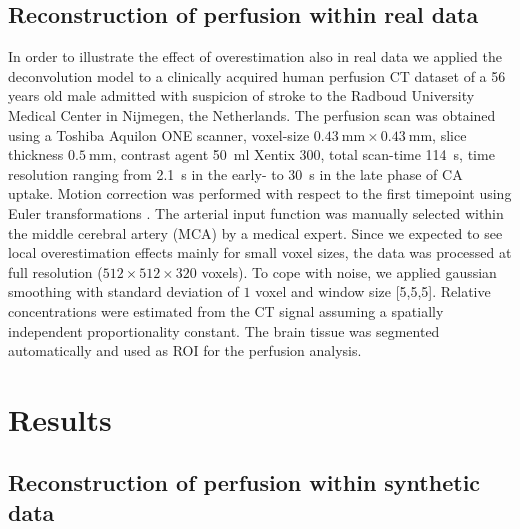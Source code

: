 \documentclass[10pt]{article}
\begin{document}
	\subsection{Reconstruction of perfusion within real data}\label{sec:RealData}
	In order to illustrate the effect of overestimation also in real data we applied the deconvolution model to a clinically acquired human perfusion CT dataset of a 56 years old male admitted with suspicion of stroke to the Radboud University Medical Center in Nijmegen, the Netherlands.
	The perfusion scan was obtained using a Toshiba Aquilon ONE scanner, voxel-size $\SI{0.43}{\milli\meter}\times\SI{0.43}{\milli\meter}$, slice thickness $\SI{0.5}{\milli\meter}$, contrast agent \SI{50}{\milli\litre} Xentix 300, total scan-time \SI{114}{\second}, time resolution ranging from \SI{2.1}{\second} in the early- to \SI{30}{\second} in the late phase of CA uptake.
	Motion correction was performed with respect to the first timepoint using Euler transformations \cite{Mendrik11}.
	The arterial input function was manually selected within the middle cerebral artery (MCA) by a medical expert.
	Since we expected to see local overestimation effects mainly for small voxel sizes, the data was processed at full resolution ($512\times512\times320$ voxels). 
	To cope with noise, we applied gaussian smoothing with standard deviation of $1$ voxel and window size [5,5,5].
	Relative concentrations were estimated from the CT signal assuming a spatially independent proportionality constant. 
	The brain tissue was segmented automatically and used as ROI for the perfusion analysis.




\section{Results}

\subsection{Reconstruction of perfusion within synthetic data}\label{sec:RecPhantom}
\end{document}
